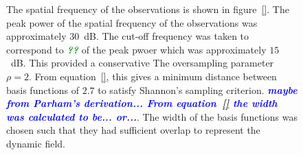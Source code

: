 \documentclass[12pt]{iopart}		%
\newcommand{\todo}[1]{\textsf{\emph{\textbf{\textcolor{blue}{#1}}}}}
\newcommand{\omg}[1]{\textsf{\emph{\textbf{\textcolor{green}{#1}}}}}
\begin{document}
\begin{figure}
The spatial frequency of the observations is shown in figure~\ref{}. The peak power of the spatial frequency of the observations was approximately $30$~dB. The cut-off frequency was taken to correspond to \omg{??} of the peak pwoer which was approximately $15$~dB. This provided a conservative The oversampling parameter $\rho=2$. From equation~\ref{}, this gives a minimum distance between basis functions of $2.7$ to satisfy Shannon's sampling criterion. \todo{maybe from Parham's derivation... From equation~\ref{} the width was calculated to be... or...}. The width of the basis functions was chosen such that they had sufficient overlap to represent the dynamic field.
	\label{fig:FrequencyAnalysis}
\end{figure}
 \begin{figure}
 	\begin{center}

\end{center}
\end{figure}
\end{document}
